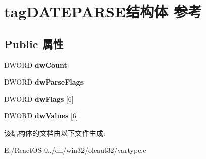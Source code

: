 \hypertarget{structtag_d_a_t_e_p_a_r_s_e}{}\section{tag\+D\+A\+T\+E\+P\+A\+R\+S\+E结构体 参考}
\label{structtag_d_a_t_e_p_a_r_s_e}
\subsection*{Public 属性}
\begin{DoxyCompactItemize}
\item 
\mbox{\label{structtag_d_a_t_e_p_a_r_s_e_a4131654d2bfe320cd6d24588c10ad8b8}} 
D\+W\+O\+RD {\bfseries dw\+Count}
\item 
\mbox{\label{structtag_d_a_t_e_p_a_r_s_e_a01f7ec83c6fbb39b0b799cc04d2d4fec}} 
D\+W\+O\+RD {\bfseries dw\+Parse\+Flags}
\item 
\mbox{\label{structtag_d_a_t_e_p_a_r_s_e_a8b4bb367f594afa5cbd21dce2b2e1a45}} 
D\+W\+O\+RD {\bfseries dw\+Flags} \mbox{[}6\mbox{]}
\item 
\mbox{\label{structtag_d_a_t_e_p_a_r_s_e_ae90a15e7d91f32760b5717d9a344571d}} 
D\+W\+O\+RD {\bfseries dw\+Values} \mbox{[}6\mbox{]}
\end{DoxyCompactItemize}


该结构体的文档由以下文件生成\+:\begin{DoxyCompactItemize}
\item 
E\+:/\+React\+O\+S-\/0../dll/win32/oleaut32/vartype.\+c\end{DoxyCompactItemize}
